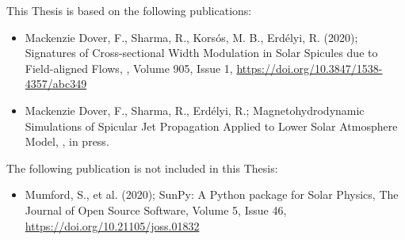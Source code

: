 \begin{publications}

This Thesis is based on the following publications:

\begin{itemize}
\item Mackenzie Dover, F., Sharma, R., Kors{\'o}s, M. B., Erd\'elyi, R. (2020); Signatures of Cross-sectional Width Modulation in Solar Spicules due to Field-aligned Flows, \apj, Volume 905, Issue 1, \url{https://doi.org/10.3847/1538-4357/abc349}

\item Mackenzie Dover, F., Sharma, R., Erd\'elyi, R.; Magnetohydrodynamic Simulations of Spicular Jet Propagation Applied to Lower Solar Atmosphere Model, \apj, in press.
\end{itemize}

The following publication is not included in this Thesis:

\begin{itemize}
\item Mumford, S., et al. (2020); SunPy: A Python package for Solar Physics, The Journal of Open Source Software, Volume 5, Issue 46, \url{https://doi.org/10.21105/joss.01832}
\end{itemize}

\end{publications}